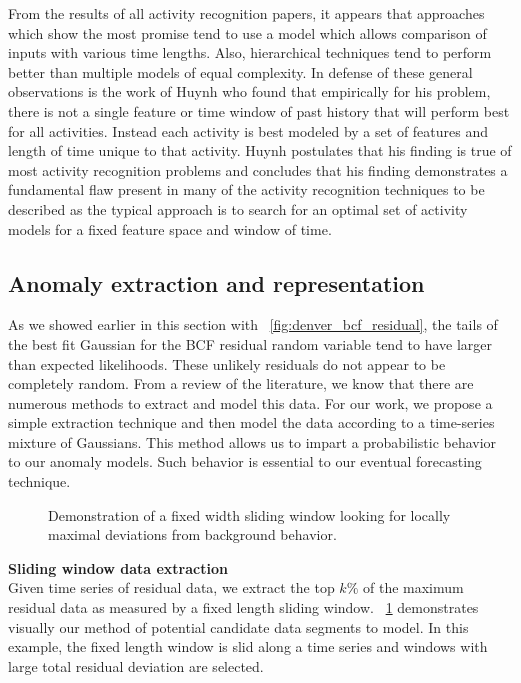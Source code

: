 From the results of all activity recognition papers, it appears that approaches which show the most promise tend to use a model which allows comparison of inputs with various time lengths.  Also, hierarchical techniques tend to perform better than multiple models of equal complexity.  In defense of these general observations is the work of Huynh \cite{Huynh2005} who found that empirically for his problem, there is not a single feature or time window of past history that will perform best for all activities.  Instead each activity is best modeled by a set of features and length of time unique to that activity.  Huynh postulates that his finding is true of most activity recognition problems and concludes that his finding demonstrates a fundamental flaw present in many of the activity recognition techniques to be described as the typical approach is to search for an optimal set of activity models for a fixed feature space and window of time.


\subsection{Anomaly extraction and representation}
As we showed earlier in this section with ~\ref{fig:denver_bcf_residual}, the tails of the best fit Gaussian for the BCF residual random variable tend to have larger than expected likelihoods.  These unlikely residuals do not appear to be completely random.  From a review of the literature, we know that there are numerous methods to extract and model this data.  For our work, we propose a simple extraction technique and then model the data according to a time-series mixture of Gaussians.  This method allows us to impart a probabilistic behavior to our anomaly models.  Such behavior is essential to our eventual forecasting technique.

\begin{figure}[]
	\begin{center}
	\end{center}
	\caption{Demonstration of a fixed width sliding window looking for locally maximal deviations from background behavior.}
	\label{fig:sliding_window}
\end{figure}

\bigskip
\noindent \textbf{Sliding window data extraction} \\
Given time series of residual data, we extract the top $k\%$ of the maximum residual data as measured by a fixed length sliding window.  ~\ref{fig:sliding_window} demonstrates visually our method of potential candidate data segments to model.  In this example, the fixed length window is slid along a time series and windows with large total residual deviation are selected. 

